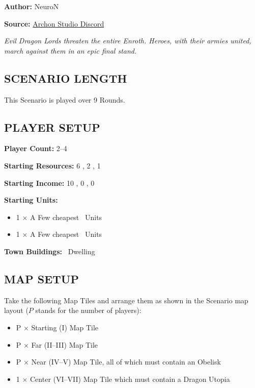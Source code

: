 
\begin{multicols}{2}

\textbf{Author:} NeuroN

\textbf{Source:} \href{https://discord.com/channels/740870068178649108/1332731339614453802/1332731339614453802}{Archon Studio Discord}

\textit{Evil Dragon Lords threaten the entire Enroth. Heroes, with their armies united, march against them in an epic final stand.}  %

\subsection*{\MakeUppercase{Scenario Length}}

This Scenario is played over 9 Rounds.

\subsection*{\MakeUppercase{Player Setup}}

\textbf{Player Count:} 2--4

\textbf{Starting Resources:} 6 , 2 , 1 

\textbf{Starting Income:} 10 , 0 , 0 

\textbf{Starting Units:}
\begin{itemize}
  \item  1 × A Few cheapest \bronze\ Units
  \item  1 × A Few cheapest \silver\ Units
\end{itemize}

\textbf{Town Buildings:} \bronze\ Dwelling

\subsection*{\MakeUppercase{Map Setup}}

Take the following Map Tiles and arrange them as shown in the Scenario map layout ($P$ stands for the number of players):

\begin{itemize}
  \item P × Starting (I) Map Tile
  \item P × Far (II--III) Map Tile
  \item P × Near (IV--V) Map Tile, all of which must contain an Obelisk
  \item 1 × Center (VI--VII) Map Tile which must contain a Dragon Utopia
\end{itemize}


\end{multicols}

